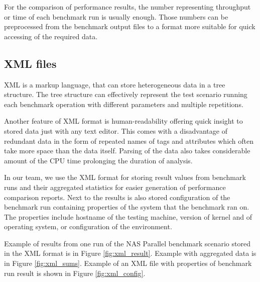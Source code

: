 For the comparison of performance results, the number representing throughput or
time of each benchmark run is usually enough. Those numbers can be preprocessed
from the benchmark output files to a format more suitable for quick accessing
of the required data.

\subsection{XML files}
XML is a markup language, that can store heterogeneous data in a tree structure.
The tree structure can effectively represent the test scenario running each
benchmark operation with different parameters and multiple repetitions.

Another feature of XML format is human-readability offering quick insight to stored
data just with any text editor.
This comes with a disadvantage of redundant data in the form of repeated names of
tags and attributes which often take more space than the data itself. Parsing of
the data also takes considerable amount of the CPU time prolonging the duration of
analysis.

In our team, we use the XML format for storing result values from benchmark runs
and their aggregated statistics for easier generation of performance comparison
reports. Next to the results is also stored configuration of the benchmark run
containing properties of the system that the benchmark ran on. The properties include
hostname of the testing machine, version of kernel and of operating system, or
configuration of the environment.

Example of results from one run of the NAS Parallel benchmark scenario stored in
the XML format is in Figure \ref{fig:xml_result}. Example with aggregated
data is in Figure \ref{fig:xml_sums}. Example of an XML file with properties
of benchmark run result is shown in Figure \ref{fig:xml_config}.

